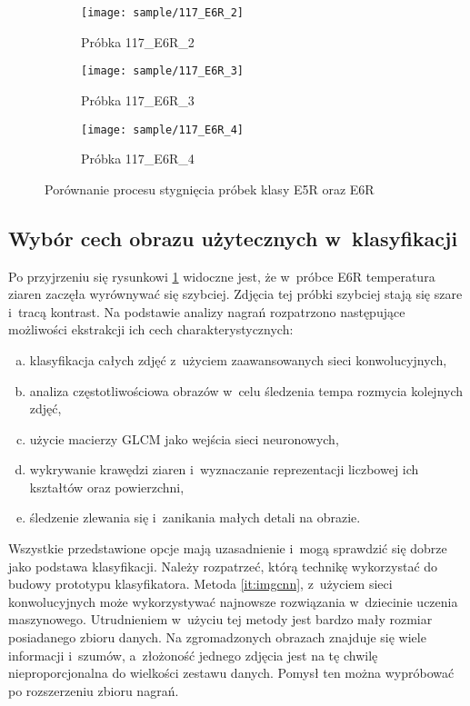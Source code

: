 \begin{figure}[htbp]
\begin{subfigure}{0.3\textwidth}
	\end{subfigure}
	\hspace{0.25cm}
	\vspace{0.5cm}
	\begin{subfigure}{0.3\textwidth}
		\centering
		\texttt{[image: sample/117\_E6R\_2]}
		\caption{Próbka 117\_E6R\_2}
	\end{subfigure}
	\hspace{0.25cm}
	\begin{subfigure}{0.3\textwidth}
		\centering
		\texttt{[image: sample/117\_E6R\_3]}
		\caption{Próbka 117\_E6R\_3}
	\end{subfigure}
	\begin{subfigure}{0.3\textwidth}
		\centering
		\texttt{[image: sample/117\_E6R\_4]}
		\caption{Próbka 117\_E6R\_4}
	\end{subfigure}
	\caption{Porównanie procesu stygnięcia próbek klasy E5R oraz E6R}
	\label{fig:samplecompare}
\end{figure}

\subsection{Wybór cech obrazu użytecznych w~klasyfikacji}
\label{subsec:featureextr}
Po przyjrzeniu się rysunkowi \ref{fig:samplecompare} widoczne jest, że
w~próbce E6R temperatura ziaren zaczęła wyrównywać się szybciej.
Zdjęcia tej próbki szybciej stają się szare i~tracą kontrast.
Na podstawie analizy nagrań rozpatrzono następujące możliwości ekstrakcji
ich cech charakterystycznych:
\begin{enumerate}[a)]
	\item \label{it:imgcnn} 
	      klasyfikacja całych zdjęć z~użyciem zaawansowanych sieci
	      konwolucyjnych,
	\item \label{it:fft} 
	      analiza częstotliwościowa obrazów w~celu śledzenia tempa rozmycia
	      kolejnych zdjęć,
	\item \label{it:glcm} 
	      użycie macierzy GLCM jako wejścia sieci neuronowych,
	\item \label{it:edge}
	      wykrywanie krawędzi ziaren i~wyznaczanie reprezentacji liczbowej
	      ich kształtów oraz powierzchni,
	\item \label{it:blob}
	      śledzenie zlewania się i~zanikania małych detali na obrazie.
\end{enumerate}

Wszystkie przedstawione opcje mają uzasadnienie i~mogą sprawdzić się dobrze
jako podstawa klasyfikacji.
Należy rozpatrzeć, którą technikę wykorzystać do budowy prototypu
klasyfikatora.
Metoda \ref{it:imgcnn}, z~użyciem sieci konwolucyjnych może
wykorzystywać najnowsze rozwiązania w~dziecinie uczenia maszynowego.
Utrudnieniem w~użyciu tej metody jest bardzo mały rozmiar posiadanego 
zbioru danych.
Na zgromadzonych obrazach znajduje się wiele informacji i~szumów,
a~złożoność jednego zdjęcia jest na tę chwilę nieproporcjonalna do wielkości
zestawu danych.
Pomysł ten można wypróbować po rozszerzeniu zbioru nagrań.

